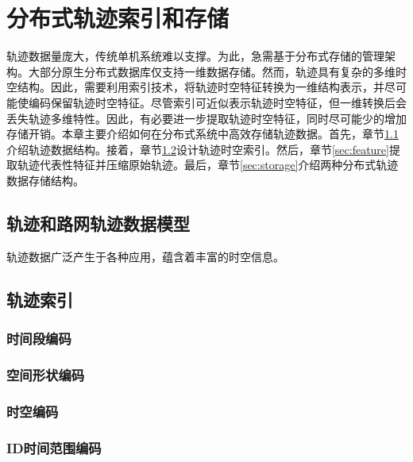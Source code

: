 \chapter{分布式轨迹索引和存储}
轨迹数据量庞大，传统单机系统难以支撑。为此，急需基于分布式存储的管理架构。大部分原生分布式数据库仅支持一维数据存储。然而，轨迹具有复杂的多维时空结构。因此，需要利用索引技术，将轨迹时空特征转换为一维结构表示，并尽可能使编码保留轨迹时空特征。尽管索引可近似表示轨迹时空特征，但一维转换后会丢失轨迹多维特性。因此，有必要进一步提取轨迹时空特征，同时尽可能少的增加存储开销。本章主要介绍如何在分布式系统中高效存储轨迹数据。首先，章节\ref{sec:data_structure}介绍轨迹数据结构。接着，章节\ref{sec:traj_index}设计轨迹时空索引。然后，章节\ref{sec:feature}提取轨迹代表性特征并压缩原始轨迹。最后，章节\ref{sec:storage}介绍两种分布式轨迹数据存储结构。

\section{轨迹和路网轨迹数据模型}
\label{sec:data_structure}
轨迹数据广泛产生于各种应用，蕴含着丰富的时空信息。

\section{轨迹索引}
\label{sec:traj_index}
\subsection{时间段编码}
\subsection{空间形状编码}
\subsection{时空编码}
\subsection{ID时间范围编码}

